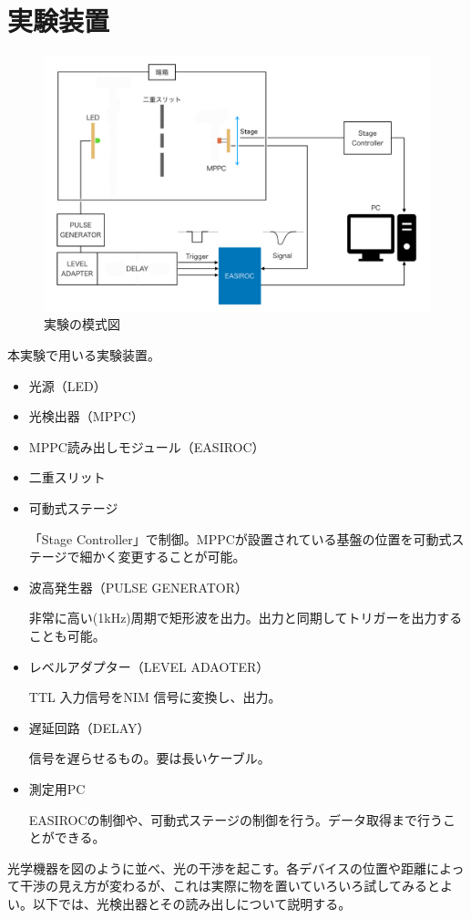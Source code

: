 
\section{実験装置}
\begin{figure}[h]
  \begin{center}
    \includegraphics[width=12cm]{setup_2021.jpeg}
  \end{center}
  \caption{実験の模式図}
\end{figure}

本実験で用いる実験装置。
\begin{itemize}
  \item 光源（LED）
  \item 光検出器（MPPC）
  \item MPPC読み出しモジュール（EASIROC）
  \item 二重スリット
  \item 可動式ステージ\par
        「Stage Controller」で制御。MPPCが設置されている基盤の位置を可動式ステージで細かく変更することが可能。
  \item 波高発生器（PULSE GENERATOR）\par
        非常に高い(1kHz)周期で矩形波を出力。出力と同期してトリガーを出力することも可能。
  \item レベルアダプター（LEVEL ADAOTER）\par
        TTL 入力信号をNIM 信号に変換し、出力。
  \item 遅延回路（DELAY）\par
        信号を遅らせるもの。要は長いケーブル。
  \item 測定用PC \par
        EASIROCの制御や、可動式ステージの制御を行う。データ取得まで行うことができる。
\end{itemize}
光学機器を図のように並べ、光の干渉を起こす。各デバイスの位置や距離によって干渉の見え方が変わるが、これは実際に物を置いていろいろ試してみるとよい。以下では、光検出器とその読み出しについて説明する。

